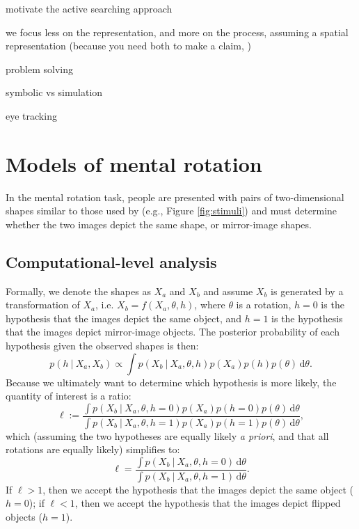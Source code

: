 \documentclass[10pt,letterpaper]{article}
\newcommand{\hi}[0]{h=0}
\newcommand{\hf}[0]{h=1}
\newcommand{\dif}[0]{\,\mathrm{d}}
\begin{document}
motivate the active searching approach
\cite{Gureckis:2012gu,Markant:2012uu} \cite{Markant:2012uu,Nelson2007}

we focus less on the representation, and more on the process, assuming
a spatial representation (because you need both to make a claim,
\cite{Anderson1978})

problem solving \cite{Hegarty2004, Schwartz1999}

symbolic vs simulation \cite{Schwartz:1996uy}

eye tracking \cite{Just1976}

\section{Models of mental rotation}

In the mental rotation task, people are presented with pairs of
two-dimensional shapes similar to those used by \cite{Cooper:1975wp}
(e.g., Figure \ref{fig:stimuli}) and must determine whether the two
images depict the same shape, or mirror-image shapes.

\subsection{Computational-level analysis}

Formally, we denote the shapes as $X_a$ and $X_b$ and assume $X_b$ is
generated by a transformation of $X_a$, i.e. $X_b=f(X_a, \theta, h)$,
where $\theta$ is a rotation, $h=0$ is the hypothesis that the images
depict the same object, and $h=1$ is the hypothesis that the images
depict mirror-image objects. The posterior probability of each
hypothesis given the observed shapes is then:
\begin{equation}
  p(h\ \vert\ X_a, X_b) \propto \int p(X_b\ \vert\ X_a, \theta, h)p(X_a)p(h)p(\theta)\dif\theta.
  \label{eq:posterior}
\end{equation}
Because we ultimately want to determine which hypothesis is more
likely, the quantity of interest is a ratio:
\begin{equation*}
  \ell := \frac{\int p(X_b\ \vert\ X_a, \theta, \hi)p(X_a)p(\hi)p(\theta)\dif\theta}{\int p(X_b\ \vert\ X_a, \theta, \hf)p(X_a)p(\hf)p(\theta)\dif\theta},
\end{equation*}
which (assuming the two hypotheses are equally likely \textit{a
  priori}, and that all rotations are equally likely) simplifies to:
\begin{equation}
  \ell = \frac{\int p(X_b\ \vert\ X_a, \theta, \hi)\dif\theta}{\int p(X_b\ \vert\ X_a, \theta, \hf)\dif\theta}.
  \label{eq:lh-ratio}
\end{equation}
If $\ell > 1$, then we accept the hypothesis that the images depict
the same object ($\hi$); if $\ell < 1$, then we accept the hypothesis
that the images depict flipped objects ($\hf$).
\end{document}
